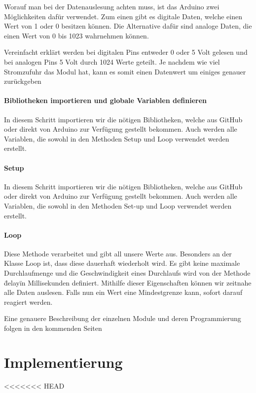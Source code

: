 Worauf man bei der Datenauslesung achten muss, ist das Arduino zwei Möglichkeiten dafür verwendet. Zum einen gibt es digitale Daten, welche einen Wert von 1 oder 0 besitzen können. Die Alternative dafür sind analoge Daten, die einen Wert von 0 bis 1023 wahrnehmen können.

Vereinfacht erklärt werden bei digitalen Pins entweder 0 oder 5 Volt gelesen und bei analogen Pins 5 Volt durch 1024 Werte geteilt. Je nachdem wie viel Stromzufuhr das Modul hat, kann es somit einen Datenwert um einiges genauer zurückgeben
\cite{analogRead}




\subsubsection{Bibliotheken importieren und globale Variablen definieren}

In diesem Schritt importieren wir die nötigen Bibliotheken, welche aus GitHub oder direkt von Arduino zur Verfügung gestellt bekommen. Auch werden alle Variablen, die sowohl in den Methoden Setup und Loop verwendet werden erstellt. 

\subsubsection{Setup}

In diesem Schritt importieren wir die nötigen Bibliotheken, welche aus GitHub oder direkt von Arduino zur Verfügung gestellt bekommen. Auch werden alle Variablen, die sowohl in den Methoden Set-up und Loop verwendet werden erstellt.  

\subsubsection{Loop}

Diese Methode verarbeitet und gibt all unsere Werte aus. Besonders an der Klasse Loop ist, dass diese dauerhaft wiederholt wird. Es gibt keine maximale Durchlaufmenge und die Geschwindigkeit eines Durchlaufs wird von der Methode \"delay\" in Millisekunden definiert. Mithilfe dieser Eigenschaften können wir zeitnahe alle Daten auslesen. Falls nun ein Wert eine Mindestgrenze kann, sofort darauf reagiert werden. 

Eine genauere Beschreibung der einzelnen Module und deren Programmierung folgen in den kommenden Seiten


\chapter{Implementierung}
<<<<<<< HEAD

